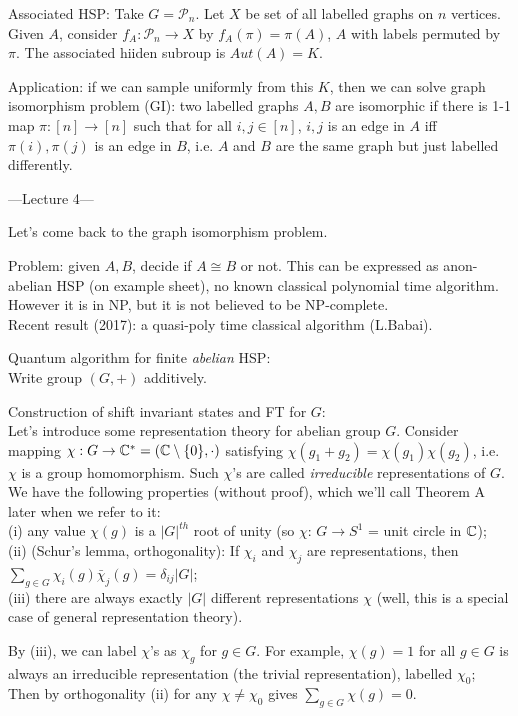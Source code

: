 \documentclass[a4paper]{article}
\begin{document}
Associated HSP: Take $G = \mathcal{P}_n$. Let $X$ be set of all labelled graphs on $n$ vertices. Given $A$, consider $f_A: \mathcal{P}_n \to X$ by $f_A(\pi) = \pi(A)$, $A$ with labels permuted by $\pi$. The associated hiiden subroup is $Aut(A) = K$.

Application: if we can sample uniformly from this $K$, then we can solve graph isomorphism problem (GI): two labelled graphs $A,B$ are isomorphic if there is 1-1 map $\pi:[n] \to [n]$ such that for all $i,j \in [n]$, $i,j$ is an edge in $A$ iff $\pi(i),\pi(j)$ is an edge in $B$, i.e. $A$ and $B$ are the same graph but just labelled differently.

---Lecture 4---

Let's come back to the graph isomorphism problem.

Problem: given $A,B$, decide if $A \cong B$ or not. This can be expressed as anon-abelian HSP (on example sheet), no known classical polynomial time algorithm. However it is in NP, but it is not believed to be NP-complete.\\
Recent result (2017): a quasi-poly time classical algorithm (L.Babai).

Quantum algorithm for finite \emph{abelian} HSP:\\
Write group $(G,+)$ additively.

Construction of shift invariant states and FT for $G$:\\
Let's introduce some representation theory for abelian group $G$. Consider mapping $\chi:G \to \mathbb{C}^* = (\mathbb{C} \setminus \{0\}, \cdot)$ satisfying $\chi(g_1+g_2) = \chi(g_1)\chi(g_2)$, i.e. $\chi$ is a group homomorphism. Such $\chi$'s are called \emph{irreducible} representations of $G$.\\
We have the following properties (without proof), which we'll call Theorem A later when we refer to it:\\
(i) any value $\chi(g)$ is a $|G|^{th}$ root of unity (so $\chi$: $G \to S^1$ = unit circle in $\mathbb{C}$);\\
(ii) (Schur's lemma, orthogonality): If $\chi_i$ and $\chi_j$ are representations, then $\sum_{g \in G} \chi_i (g) \bar{\chi}_j(g) =\delta_{ij}|G|$;\\
(iii) there are always exactly $|G|$ different representations $\chi$ (well, this is a special case of general representation theory).

By (iii), we can label $\chi$'s as $\chi_g$ for $g \in G$. For example, $\chi(g) = 1$ for all $g \in G$ is always an irreducible representation (the trivial representation), labelled $\chi_0$;\\
Then by orthogonality (ii) for any $\chi \neq \chi_0$ gives $\sum_{g \in G} \chi(g) = 0$.
\end{document}
